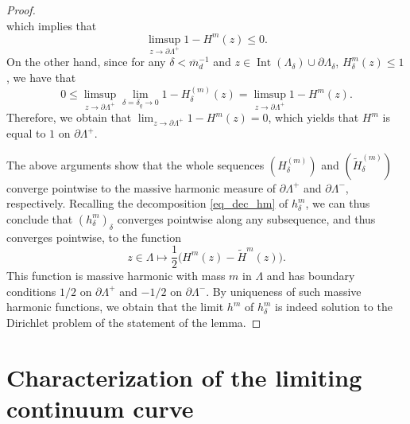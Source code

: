 \documentclass{article}
\theoremstyle{definition}
\theoremstyle{remark}
\theoremstyle{remark}
\begin{document}
\begin{proof}
\begin{equation*}
\end{equation*}
which implies that
\begin{equation*}
    \limsup_{z \to \partial \Lambda^{+}} 1-H^m(z) \leq 0.
\end{equation*}
On the other hand, since for any $\delta< \overline{m}_d^{-1}$ and $z \in \operatorname{Int}(\Lambda_{\delta}) \cup \partial \Lambda_{\delta}$, $H_{\delta}^{m}(z) \leq 1$, we have that
\begin{equation*}
    0 \leq \limsup_{z \to \partial \Lambda^{+}} \lim_{\delta = \delta_{q} \to 0} 1- H_{\delta}^{(m)}(z) = \limsup_{z \to \partial \Lambda^{+}} 1-H^m(z).
\end{equation*}
Therefore, we obtain that $\lim_{z \to \partial \Lambda^{+}} 1-H^m(z) = 0$, which yields that $H^m$ is equal to $1$ on $\partial \Lambda^{+}$.

The above arguments show that the whole sequences $(H_{\delta}^{(m)})$ and $(\tilde H_{\delta}^{(m)})$ converge pointwise to the massive harmonic measure of $\partial \Lambda^{+}$ and $\partial \Lambda^{-}$, respectively. Recalling the decomposition \eqref{eq_dec_hm} of $h_{\delta}^m$, we can thus conclude that $(h_{\delta}^m)_{\delta}$ converges pointwise along any subsequence, and thus converges pointwise, to the function
\begin{equation*}
    z \in \Lambda \mapsto \frac{1}{2} \bigg( H^m(z) - \tilde H^m(z) \bigg).
\end{equation*}
This function is massive harmonic with mass $m$ in $\Lambda$ and has boundary conditions $1/2$ on $\partial \Lambda^{+}$ and $-1/2$ on $\partial \Lambda^{-}$. By uniqueness of such massive harmonic functions, we obtain that the limit $h^m$ of $h_{\delta}^m$ is indeed solution to the Dirichlet problem of the statement of the lemma.
\end{proof}

\section{Characterization of the limiting continuum curve} \label{sec_charac}
\end{document}
